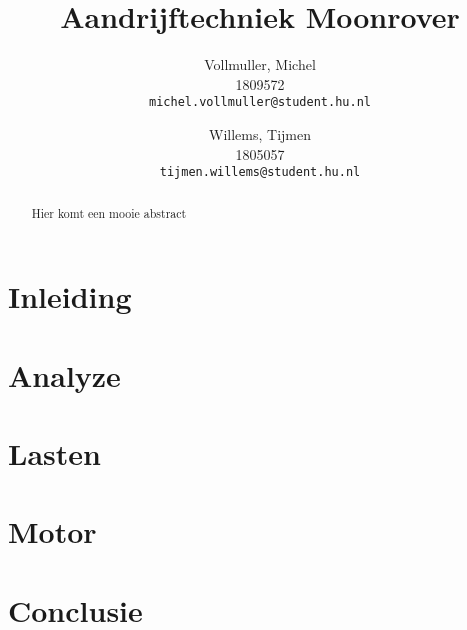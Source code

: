 \documentclass{article}
\title{Aandrijftechniek Moonrover}
\author{
  Vollmuller, Michel\\
  1809572\\
  \texttt{michel.vollmuller@student.hu.nl}
  \and
  Willems, Tijmen\\
  1805057\\
  \texttt{tijmen.willems@student.hu.nl}
}
\begin{document}
\maketitle

\begin{abstract}
    Hier komt een mooie abstract
\end{abstract}

\tableofcontents

\newpage

\section{Inleiding}


\section{Analyze} 


\newpage

\section{Lasten}


\newpage

\section{Motor}


\newpage

\section*{Conclusie}


% 
% 

% 
% 
\end{document}
